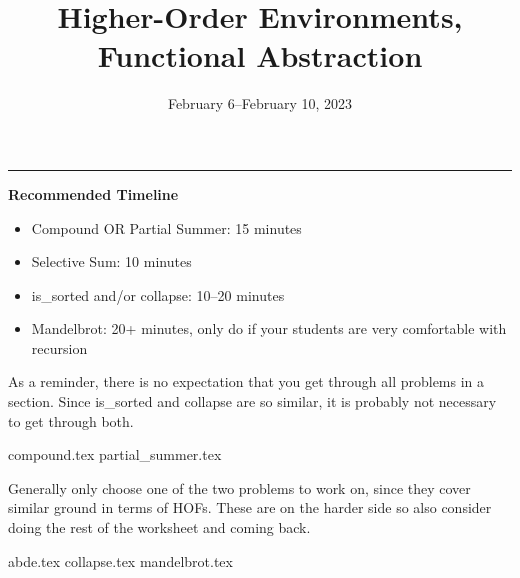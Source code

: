 \documentclass{exam}
\title{Higher-Order Environments, Functional Abstraction}
\date{February 6--February 10, 2023}
\begin{document}
\maketitle
\rule{\textwidth}{0.15em}
\fontsize{12}{15}\selectfont

\begin{meta}
\textbf{Recommended Timeline}
\begin{itemize}
    \item Compound OR Partial Summer: 15 minutes
    \item Selective Sum: 10 minutes
    \item is\_sorted and/or collapse: 10--20 minutes
    \item Mandelbrot: 20+ minutes, only do if your students are very comfortable with recursion
\end{itemize}
As a reminder, there is no expectation that you get through all problems in a section. Since is\_sorted and collapse are so similar, it is probably not necessary to get through both. 
\end{meta}

\begin{questions}
    {compound.tex}
    {partial_summer.tex}
    \begin{questionmeta}
        Generally only choose one of the two problems to work on, since they cover similar ground in terms of HOFs. These are on the harder side so also consider doing the rest of the worksheet and coming back.
    \end{questionmeta}
    {abde.tex}
    {collapse.tex}
    {mandelbrot.tex}
\end{questions}
\end{document}
